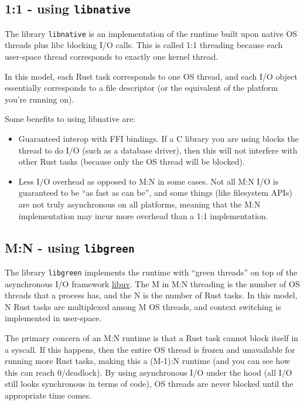 \documentclass[]{article}
\begin{document}
\subsection{1:1 - using \texttt{libnative}}\label{using-libnative}

The library \texttt{libnative} is an implementation of the runtime built
upon native OS threads plus libc blocking I/O calls. This is called 1:1
threading because each user-space thread corresponds to exactly one
kernel thread.

In this model, each Rust task corresponds to one OS thread, and each I/O
object essentially corresponds to a file descriptor (or the equivalent
of the platform you're running on).

Some benefits to using libnative are:

\begin{itemize}
\itemsep1pt\parskip0pt
\item
  Guaranteed interop with FFI bindings. If a C library you are using
  blocks the thread to do I/O (such as a database driver), then this
  will not interfere with other Rust tasks (because only the OS thread
  will be blocked).
\item
  Less I/O overhead as opposed to M:N in some cases. Not all M:N I/O is
  guaranteed to be ``as fast as can be'', and some things (like
  filesystem APIs) are not truly asynchronous on all platforms, meaning
  that the M:N implementation may incur more overhead than a 1:1
  implementation.
\end{itemize}

\subsection{M:N - using \texttt{libgreen}}\label{mn---using-libgreen}

The library \texttt{libgreen} implements the runtime with ``green
threads'' on top of the asynchronous I/O framework
\href{https://github.com/joyent/libuv/}{libuv}. The M in M:N threading
is the number of OS threads that a process has, and the N is the number
of Rust tasks. In this model, N Rust tasks are multiplexed among M OS
threads, and context switching is implemented in user-space.

The primary concern of an M:N runtime is that a Rust task cannot block
itself in a syscall. If this happens, then the entire OS thread is
frozen and unavailable for running more Rust tasks, making this a
(M-1):N runtime (and you can see how this can reach 0/deadlock). By
using asynchronous I/O under the hood (all I/O still looks synchronous
in terms of code), OS threads are never blocked until the appropriate
time comes.
\end{document}
